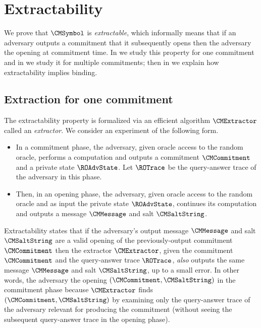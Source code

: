 \section{Extractability}
\label{section:basic-commitment-extractability}

We prove that $\CMSymbol$ is \emph{extractable}, which informally means that if an adversary outputs a commitment that it subsequently opens then the adversary  the opening at commitment time. In  we study this property for one commitment and in  we study it for multiple commitments; then in  we explain how extractability implies binding.

\subsection{Extraction for one commitment}
\label{section:basic-commitment-single-extractability}

The extractability property is formalized via an efficient algorithm $\CMExtractor$ called an \emph{extractor}. We consider an experiment of the following form.
\begin{itemize}

  \item In a commitment phase, the adversary, given oracle access to the random oracle, performs a computation and outputs a commitment $\CMCommitment$ and a private state $\ROAdvState$. Let $\ROTrace$ be the query-answer trace of the adversary in this phase.

  \item Then, in an opening phase, the adversary, given oracle access to the random oracle and as input the private state $\ROAdvState$, continues its computation and outputs a message $\CMMessage$ and salt $\CMSaltString$.

\end{itemize}
Extractability states that if the adversary's output message $\CMMessage$ and salt $\CMSaltString$ are a valid opening of the previously-output commitment $\CMCommitment$ then the extractor $\CMExtractor$, given the commitment $\CMCommitment$ and the query-answer trace $\ROTrace$, \emph{also} outputs the same message $\CMMessage$ and salt $\CMSaltString$, up to a small error. In other words, the adversary  the opening $(\CMCommitment,\CMSaltString)$ in the commitment phase because $\CMExtractor$ finds $(\CMCommitment,\CMSaltString)$ by examining only the query-answer trace of the adversary relevant for producing the commitment (without seeing the subsequent query-answer trace in the opening phase).

